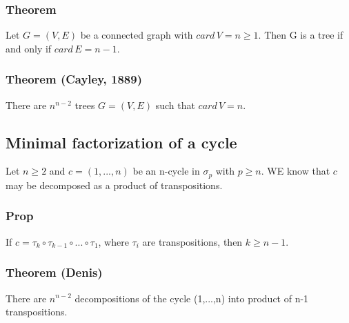             \subsubsection{Theorem}
                Let $G=(V,E)$ be a connected graph with $card\,V=n\geq 1$. Then G is a tree if and only if $card\, E=n-1$.

            \subsubsection{Theorem (Cayley, 1889)}
                There are $n^{n-2}$ trees $G=(V,E)$ such that $card\,V=n$.

        \newpage

        \subsection{Minimal factorization of a cycle}
            Let $n\geq 2$ and $c=(1,...,n)$ be an n-cycle in $\sigma_p$ with $p\geq n$. WE know that $c$ may be decomposed as a product of transpositions.

            \subsubsection{Prop}
                If $c=\tau_k\circ\tau_{k-1}\circ...\circ\tau_1$, where $\tau_i$ are transpositions, then $k\geq n-1$.

            \subsubsection{Theorem (Denis)}
                There are $n^{n-2}$ decompositions of the cycle (1,...,n) into product of n-1 transpositions.

